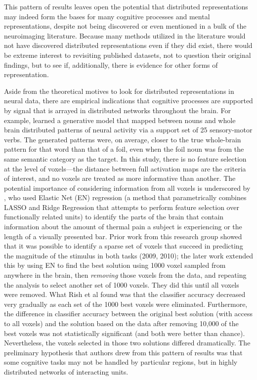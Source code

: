 This pattern of results leaves open the potential that distributed representations may indeed form the bases for many cognitive processes and mental representations, despite not being discovered or even mentioned in a bulk of the neuroimaging literature. Because many methods utilized in the literature would not have discovered distributed representations even if they did exist, there would be extreme interest to revisiting published datasets, not to question their original findings, but to see if, additionally, there is evidence for other forms of representation.

Aside from the theoretical motives to look for distributed representations in neural data, there are empirical indications that cognitive processes are supported by signal that is arrayed in distributed networks throughout the brain. For example, \cite{mitchell_predicting_2008} learned a generative model that mapped between nouns and whole brain distributed patterns of neural activity via a support set of 25 sensory-motor verbs. The generated patterns were, on average, closer to the true whole-brain pattern for that word than that of a foil, even when the foil noun was from the same semantic category as the target. In this study, there is no feature selection at the level of voxels---the distance between full activation maps are the criteria of interest, and no voxels are treated as more informative than another. The potential importance of considering information from all voxels is underscored by , who used Elastic Net (EN) regression (a method that parametrically combines LASSO and Ridge Regression that attempts to perform feature selection over functionally related units) to identify the parts of the brain that contain information about the amount of thermal pain a subject is experiencing or the length of a visually presented bar. Prior work from this research group showed that it was possible to identify a sparse set of voxels that succeed in predicting the magnitude of the stimulus in both tasks (2009, 2010); the later work extended this by using EN to find the best solution using 1000 voxel sampled from anywhere in the brain, then {\em removing} those voxels from the data, and  repeating the analysis to select another set of 1000 voxels. They did this until all voxels were removed. What Rish et al found was that the classifier accuracy decreased very gradually as each set of the 1000 best voxels were eliminated. Furthermore, the difference in classifier accuracy between the original best solution (with access to all voxels) and the solution based on the data after removing 10,000 of the best voxels was not statistically significant (and both were better than chance). Nevertheless, the voxels selected in those two solutions differed dramatically.  The preliminary hypothesis that authors drew from this pattern of results was that some cognitive tasks may not be handled by particular regions, but in highly distributed networks of interacting units.

